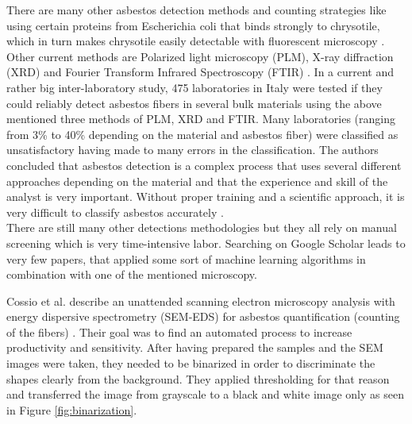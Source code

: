 There are many other asbestos detection methods and counting strategies like using certain proteins from Escherichia coli that binds strongly to chrysotile, which in turn makes chrysotile easily detectable with fluorescent microscopy \cite{kuroda2008detection}. Other current methods are Polarized light microscopy (PLM), X-ray diffraction (XRD) and Fourier Transform Infrared Spectroscopy (FTIR) \cite{campopiano2018inter}. In a current and rather big inter-laboratory study, 475 laboratories in Italy were tested if they could reliably detect asbestos fibers in several bulk materials using the above mentioned three methods of PLM, XRD and FTIR. Many laboratories (ranging from 3\% to 40\% depending on the material and asbestos fiber) were classified as unsatisfactory having made to many errors in the classification. The authors concluded that asbestos detection is a complex process that uses several different approaches depending on the material and that the experience and skill of the analyst is very important. Without proper training and a scientific approach, it is very difficult to classify asbestos accurately \cite{campopiano2018inter}. \\

There are still many other detections methodologies but they all rely on manual screening which is very time-intensive labor. Searching on Google Scholar leads to very few papers, that applied some sort of machine learning algorithms in combination with one of the mentioned microscopy.

Cossio et al. describe an unattended scanning electron microscopy analysis with energy dispersive spectrometry (SEM-EDS) for asbestos quantification (counting of the fibers) \cite{cossio2018innovative}. Their goal was to find an automated process to increase productivity and sensitivity. After having prepared the samples and the SEM images were taken, they needed to be binarized in order to discriminate the shapes clearly from the background. They applied thresholding for that reason and transferred the image from grayscale to a black and white image only as seen in Figure \ref{fig:binarization}.

